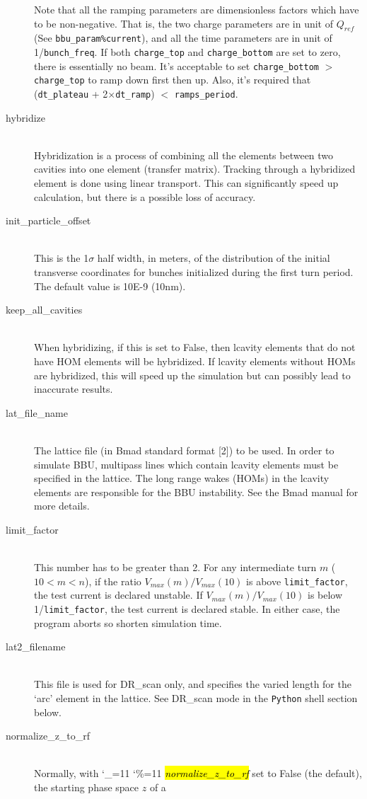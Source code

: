 \documentclass{hitec}
\newcommand\dottcmd[1]{\hl{\em#1}\endgroup}
\newcommand{\vn}{\begingroup\catcode`\_=11 \catcode`\%=11 \dottcmd}
\newcommand{\Newline}{\hfil \\}
\begin{document}
\begin{description}
Note that all the ramping parameters are dimensionless factors which have to be non-negative. That is, the two charge parameters are in unit of $Q_{ref}$ (See \texttt{bbu_param\%current}), and all the time parameters are in unit of 1/\texttt{bunch_freq}. If both \texttt{charge_top} and \texttt{charge_bottom} are set to zero, there is essentially no beam. It's acceptable to set \texttt{charge_bottom} $>$ \texttt{charge_top} to ramp down first then up. Also, it's required that (\texttt{dt_plateau} + 2$\times$\texttt{dt_ramp}) $<$ \texttt{ramps_period}.  
%
\item[hybridize] \Newline
Hybridization is a process of combining all the elements between two cavities into one element (transfer matrix). Tracking through a hybridized element is done using linear transport. This can significantly speed up calculation, but there is a possible loss of accuracy. 
%
\item[init_particle_offset] \Newline
This is the 1$\sigma$ half width, in meters, of the distribution of the initial transverse coordinates
for bunches initialized during the first turn period. The default value is 10E-9 (10nm).
%
\item[keep_all_cavities] \Newline
When hybridizing, if this is set to False, then lcavity elements that do not have HOM elements will be hybridized. If lcavity elements without HOMs are
hybridized, this will speed up the simulation but can possibly lead to inaccurate results.
%
\item[lat_file_name] \Newline
The lattice file (in Bmad standard format [2]) to be used. In order to simulate BBU, multipass lines which contain lcavity elements must be specified in the lattice. The long range wakes (HOMs) in the lcavity elements are responsible for the BBU instability. See the Bmad manual for more details.
%
\item[limit_factor] \Newline
This number has to be greater than 2.
For any intermediate turn $m$ ($10<m<n$), if the ratio $V_{max}(m)/V_{max}(10)$ is above \texttt{limit_factor}, the test current is declared unstable. If $V_{max}(m)/V_{max}(10)$ is below 1/\texttt{limit_factor}, the test current is declared stable. In either case, the program aborts so shorten simulation time.
%
\item[lat2_filename] \Newline
This file is used for DR_scan only, and specifies the varied length for the `arc' element in the lattice. See DR_scan mode in the \texttt{Python} shell section below.
%
\item[normalize_z_to_rf] \Newline
Normally, with \vn{normalize_z_to_rf} set to False (the default), the starting phase space $z$ of a

\end{description}
\end{document}
